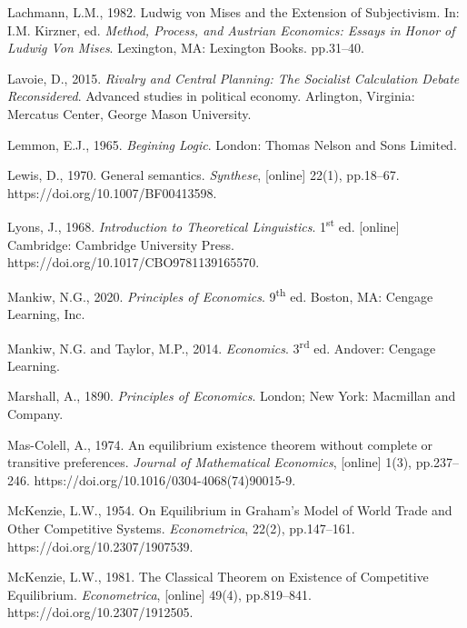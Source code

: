 Lachmann, L.M., 1982. Ludwig von Mises and the Extension of Subjectivism. In: I.M. Kirzner, ed. \textit{Method, Process, and Austrian Economics: Essays in Honor of Ludwig Von Mises}. Lexington, MA: Lexington Books. pp.31–40.



Lavoie, D., 2015. \textit{Rivalry and Central Planning: The Socialist Calculation Debate Reconsidered}. Advanced studies in political economy. Arlington, Virginia: Mercatus Center, George Mason University.



Lemmon, E.J., 1965. \textit{Begining Logic}. London: Thomas Nelson and Sons Limited.



Lewis, D., 1970. General semantics. \textit{Synthese}, [online] 22(1), pp.18–67. https://doi.org/10.1007/BF00413598.



Lyons, J., 1968. \textit{Introduction to Theoretical Linguistics}. 1\textsuperscript{st} ed. [online] Cambridge: Cambridge University Press. https://doi.org/10.1017/CBO9781139165570.



Mankiw, N.G., 2020. \textit{Principles of Economics}. 9\textsuperscript{th} ed. Boston, MA: Cengage Learning, Inc.



Mankiw, N.G. and Taylor, M.P., 2014. \textit{Economics}. 3\textsuperscript{rd} ed. Andover: Cengage Learning.



Marshall, A., 1890. \textit{Principles of Economics}. London; New York: Macmillan and Company.



Mas-Colell, A., 1974. An equilibrium existence theorem without complete or transitive preferences. \textit{Journal of Mathematical Economics}, [online] 1(3), pp.237–246. https://doi.org/10.1016/0304-4068(74)90015-9.



McKenzie, L.W., 1954. On Equilibrium in Graham's Model of World Trade and Other Competitive Systems. \textit{Econometrica}, 22(2), pp.147–161. https://doi.org/10.2307/1907539.



McKenzie, L.W., 1981. The Classical Theorem on Existence of Competitive Equilibrium. \textit{Econometrica}, [online] 49(4), pp.819–841. https://doi.org/10.2307/1912505.



